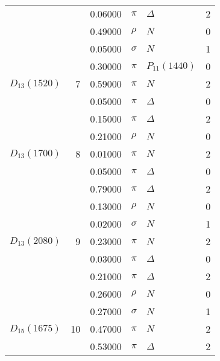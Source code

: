 \documentclass[a4paper,10pt]{article}
\begin{document}
\begin{tabular}[t]{|lr|l|ll|l|}
$                    $&   & 0.06000&$ \pi                 $ &$ \Delta              $& 2\\
$                    $&   & 0.49000&$ \rho                $ &$ N                   $& 0\\
$                    $&   & 0.05000&$ \sigma              $ &$ N                   $& 1\\
$                    $&   & 0.30000&$ \pi                 $ &$ P_{11}(1440)        $& 0\\
\hline
$      D_{13}(1520)  $&  7& 0.59000&$ \pi                 $ &$ N                   $& 2\\
$                    $&   & 0.05000&$ \pi                 $ &$ \Delta              $& 0\\
$                    $&   & 0.15000&$ \pi                 $ &$ \Delta              $& 2\\
$                    $&   & 0.21000&$ \rho                $ &$ N                   $& 0\\
\hline
$      D_{13}(1700)  $&  8& 0.01000&$ \pi                 $ &$ N                   $& 2\\
$                    $&   & 0.05000&$ \pi                 $ &$ \Delta              $& 0\\
$                    $&   & 0.79000&$ \pi                 $ &$ \Delta              $& 2\\
$                    $&   & 0.13000&$ \rho                $ &$ N                   $& 0\\
$                    $&   & 0.02000&$ \sigma              $ &$ N                   $& 1\\
\hline
$      D_{13}(2080)  $&  9& 0.23000&$ \pi                 $ &$ N                   $& 2\\
$                    $&   & 0.03000&$ \pi                 $ &$ \Delta              $& 0\\
$                    $&   & 0.21000&$ \pi                 $ &$ \Delta              $& 2\\
$                    $&   & 0.26000&$ \rho                $ &$ N                   $& 0\\
$                    $&   & 0.27000&$ \sigma              $ &$ N                   $& 1\\
\hline
$      D_{15}(1675)  $& 10& 0.47000&$ \pi                 $ &$ N                   $& 2\\
$                    $&   & 0.53000&$ \pi                 $ &$ \Delta              $& 2\\

\end{tabular}
\end{document}
